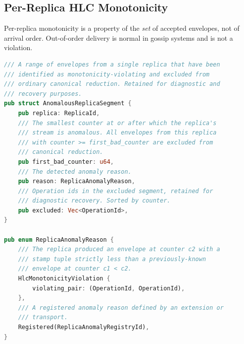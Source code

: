 \documentclass[11pt,letterpaper]{report}
\begin{document}
\subsection{Per-Replica HLC Monotonicity}
\label{sec:semops:hlc-monotonicity}

Per-replica monotonicity is a property of the \emph{set} of
accepted envelopes, not of arrival order. Out-of-order delivery
is normal in gossip systems and is not a violation.

\begin{lstlisting}[language=Rust]
/// A range of envelopes from a single replica that have been
/// identified as monotonicity-violating and excluded from
/// ordinary canonical reduction. Retained for diagnostic and
/// recovery purposes.
pub struct AnomalousReplicaSegment {
    pub replica: ReplicaId,
    /// The smallest counter at or after which the replica's
    /// stream is anomalous. All envelopes from this replica
    /// with counter >= first_bad_counter are excluded from
    /// canonical reduction.
    pub first_bad_counter: u64,
    /// The detected anomaly reason.
    pub reason: ReplicaAnomalyReason,
    /// Operation ids in the excluded segment, retained for
    /// diagnostic recovery. Sorted by counter.
    pub excluded: Vec<OperationId>,
}

pub enum ReplicaAnomalyReason {
    /// The replica produced an envelope at counter c2 with a
    /// stamp tuple strictly less than a previously-known
    /// envelope at counter c1 < c2.
    HlcMonotonicityViolation {
        violating_pair: (OperationId, OperationId),
    },
    /// A registered anomaly reason defined by an extension or
    /// transport.
    Registered(ReplicaAnomalyRegistryId),
}
\end{lstlisting}
\end{document}
